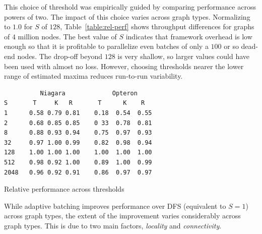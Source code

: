 This choice of threshold was empirically guided by comparing
performance across powers of two. The impact of this choice varies
across graph types. Normalizing to $1.0$ for $S$ of $128$,
Table~\ref{table:rel-perf} shows throughput differences for graphs of
$4$ million nodes.  The best value of $S$ indicates that \XWS{} framework
overhead is low enough so that it is profitable to parallelize even batches
of only a $100$ or so dead-end nodes. The drop-off beyond $128$ is
very shallow, so larger values could have been used with almost no
loss.  However, choosing thresholds nearer the lower range of
estimated maxima reduces run-to-run variability.

\begin{table}
{\footnotesize
\begin{verbatim}
          Niagara             Opteron
S       T     K   R       T      K    R
1      0.58 0.79 0.81    0.18  0.54  0.55
2      0.68 0.85 0.85    0 33  0.78  0.81
8      0.88 0.93 0.94    0.75  0.97  0.93
32     0.97 1.00 0.99    0.82  0.98  0.94
128    1.00 1.00 1.00    1.00  1.00  1.00
512    0.98 0.92 1.00    0.89  1.00  0.99
2048   0.96 0.92 0.91    0.86  0.97  0.97
\end{verbatim}}
\caption{Relative performance across thresholds}\label{table:rel-perf}
\end{table}
While adaptive batching improves performance over DFS (equivalent to
$S=1$) across graph types, the extent of the improvement varies
considerably across graph types. This is due to two main factors,
{\em locality} and {\em connectivity}.

